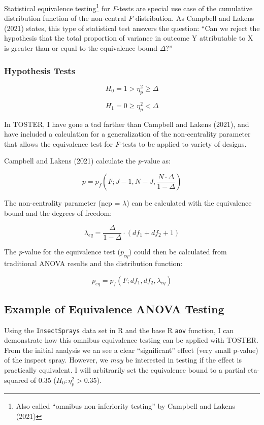 \documentclass[
]{interact}
\begin{document}
Statistical equivalence testing\footnote{Also called ``omnibus
  non-inferiority testing'' by Campbell and Lakens (2021)} for
\emph{F}-tests are special use case of the cumulative distribution
function of the non-central \emph{F} distribution. As Campbell and
Lakens (2021) states, this type of statistical test answers the
question: ``Can we reject the hypothesis that the total proportion of
variance in outcome Y attributable to X is greater than or equal to the
equivalence bound \(\Delta\)?''

\hypertarget{hypothesis-tests}{%
\subsubsection{Hypothesis Tests}\label{hypothesis-tests}}

\[
H_0 =  1 > \eta^2_p \geq \Delta
\]

\[
H_1 =  0 \geq \eta^2_p < \Delta
\]

In TOSTER, I have gone a tad farther than Campbell and Lakens (2021),
and have included a calculation for a generalization of the
non-centrality parameter that allows the equivalence test for
\emph{F}-tests to be applied to variety of designs.

Campbell and Lakens (2021) calculate the \emph{p}-value as:

\[
p = p_f(F; J-1, N-J, \frac{N \cdot \Delta}{1-\Delta})
\]

The non-centrality parameter (ncp = \(\lambda\)) can be calculated with
the equivalence bound and the degrees of freedom:

\[
\lambda_{eq} = \frac{\Delta}{1-\Delta} \cdot(df_1 + df_2 +1)
\]

\newpage

The \emph{p}-value for the equivalence test (\(p_{eq}\)) could then be
calculated from traditional ANOVA results and the distribution function:

\[
p_{eq} = p_f(F; df_1, df_2, \lambda_{eq})
\]

\hypertarget{example-of-equivalence-anova-testing}{%
\subsection{Example of Equivalence ANOVA
Testing}\label{example-of-equivalence-anova-testing}}

Using the \texttt{InsectSprays} data set in R and the base R
\texttt{aov} function, I can demonstrate how this omnibus equivalence
testing can be applied with TOSTER. From the initial analysis we an see
a clear ``significant'' effect (very small p-value) of the inspect
spray. However, we \emph{may} be interested in testing if the effect is
practically equivalent. I will arbitrarily set the equivalence bound to
a partial eta-squared of 0.35 (\(H_0: \eta^2_p > 0.35\)).
\end{document}
